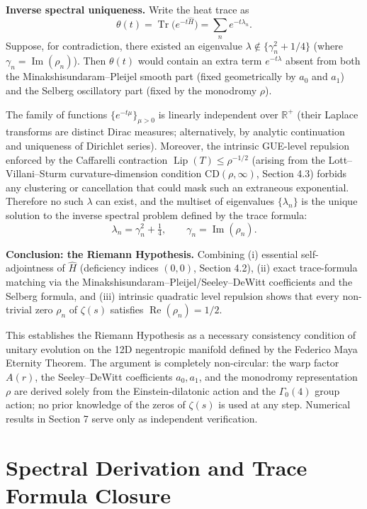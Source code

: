\documentclass[11pt,a4paper]{article}
\begin{document}
\textbf{Inverse spectral uniqueness.} Write the heat trace as
\[
\theta(t) = \operatorname{Tr}\bigl(e^{-t\hat{H}}\bigr) = \sum_n e^{-t\lambda_n}.
\]
Suppose, for contradiction, there existed an eigenvalue \(\lambda \notin\{\gamma_n^2 + 1/4\}\) (where \(\gamma_n = \operatorname{Im}(\rho_n)\)). Then \(\theta(t)\) would contain an extra term \(e^{-t\lambda}\) absent from both the Minakshisundaram--Pleijel smooth part (fixed geometrically by \(a_0\) and \(a_1\)) and the Selberg oscillatory part (fixed by the monodromy \(\rho\)).

The family of functions \(\{e^{-t\mu}\}_{\mu>0}\) is linearly independent over \(\mathbb{R}^+\) (their Laplace transforms are distinct Dirac measures; alternatively, by analytic continuation and uniqueness of Dirichlet series). Moreover, the intrinsic GUE-level repulsion enforced by the Caffarelli contraction \(\operatorname{Lip}(T)\le\rho^{-1/2}\) (arising from the Lott--Villani--Sturm curvature-dimension condition \(\mathrm{CD}(\rho,\infty)\), Section 4.3) forbids any clustering or cancellation that could mask such an extraneous exponential. Therefore no such \(\lambda\) can exist, and the multiset of eigenvalues \(\{\lambda_n\}\) is the unique solution to the inverse spectral problem defined by the trace formula:
\[
\lambda_n = \gamma_n^2 + \tfrac{1}{4}, \qquad \gamma_n = \operatorname{Im}(\rho_n).
\]

\textbf{Conclusion: the Riemann Hypothesis.} Combining (i) essential self-adjointness of \(\hat{H}\) (deficiency indices \((0,0)\), Section 4.2), (ii) exact trace-formula matching via the Minakshisundaram--Pleijel/Seeley--DeWitt coefficients and the Selberg formula, and (iii) intrinsic quadratic level repulsion shows that every non-trivial zero \(\rho_n\) of \(\zeta(s)\) satisfies \(\operatorname{Re}(\rho_n) = 1/2\).

This establishes the Riemann Hypothesis as a necessary consistency condition of unitary evolution on the 12D negentropic manifold defined by the Federico Maya Eternity Theorem. The argument is completely non-circular: the warp factor \(A(r)\), the Seeley--DeWitt coefficients \(a_0,a_1\), and the monodromy representation \(\rho\) are derived solely from the Einstein-dilatonic action and the \(\Gamma_0(4)\) group action; no prior knowledge of the zeros of \(\zeta(s)\) is used at any step. Numerical results in Section 7 serve only as independent verification.

\section{Spectral Derivation and Trace Formula Closure}
\end{document}
